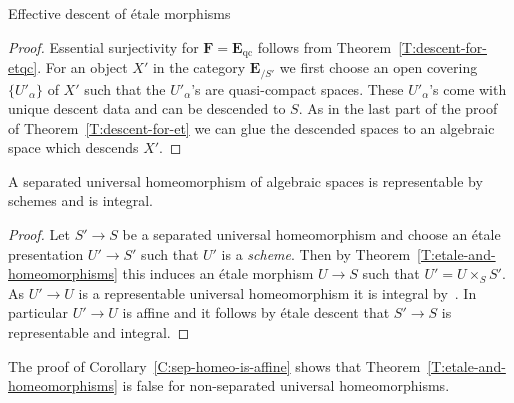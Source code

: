 \documentclass[a4paper,twoside,11pt]{amsart}[2009/07/02] %
\newcommand{\pref}[1]{\eqref{#1}}
\newcommand{\etale}{\'{e}tale}
\newcommand{\catE}{\mathbf{E}}
\newcommand{\catF}{\mathbf{F}}
\newcommand{\qc}{\mathrm{qc}}
\begin{document}
\begin{section}{Effective descent of \etale{} morphisms}
\begin{proof}
Essential surjectivity for $\catF=\catE_{\qc}$ follows from
Theorem~\pref{T:descent-for-etqc}. For an object $X'$ in the category
$\catE_{/S'}$ we first choose an open covering $\{U'_\alpha\}$ of $X'$ such
that the $U'_\alpha$'s are quasi-compact spaces. These $U'_\alpha$'s come with
unique descent data and can be descended to $S$. As in the last part of the
proof of Theorem~\pref{T:descent-for-et} we can glue the descended spaces to
an algebraic space which descends $X'$.
%
%
\end{proof}

\begin{corollary}\label{C:sep-homeo-is-affine}
A separated universal homeomorphism of algebraic spac\-es is representable by
schemes and is integral.
\end{corollary}
\begin{proof}
Let $S'\to S$ be a separated universal homeomorphism and choose an \etale{}
presentation $U'\to S'$ such that $U'$ is a \emph{scheme}. Then by
Theorem~\pref{T:etale-and-homeomorphisms} this induces an \etale{} morphism
$U\to S$ such that $U'=U\times_S S'$. As $U'\to U$ is a representable universal
homeomorphism it is integral by~\cite[Cor.~18.12.11]{egaIV}. In particular
$U'\to U$ is affine and it follows by \etale{} descent that $S'\to S$ is
representable and integral.
\end{proof}

\begin{remark}
The proof of Corollary~\pref{C:sep-homeo-is-affine} shows that
Theorem~\pref{T:etale-and-homeomorphisms} is false for non-separated universal
homeomorphisms.
\end{remark}


\end{section}
\end{document}
